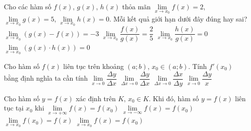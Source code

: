 \begin{ex}%
 Cho các hàm số $f(x)$, $g(x)$, $h(x)$ thỏa mãn $\lim\limits_{x \to x_0} f(x)=2$, $\lim\limits_{x \to x_0} g(x)=5$, $\lim\limits_{x \to  x_0} h(x)=0$. Mỗi kết quả giới hạn dưới đây đúng hay sai?
  \choiceTF
  {$\lim\limits_{x  \to x_0} (g(x)-f(x))=-3$}
  {\True $\lim\limits_{x \to  x_0} \dfrac{f(x)}{g(x)}=\dfrac{2}{5}$}
   {\True $\lim\limits_{x \to x_0} \dfrac{h(x)}{g(x)}=0$}
  {\True $\lim\limits_{x \to  x_0} (g(x)\cdot h(x))=0$}
\end{ex}

\begin{ex}%
	Cho hàm số $ f\left( x \right)  $ liên tục trên khoảng $ (a;b) $, $ x_0 \in (a;b) $. Tính $ f'\left( x_0 \right) $ bằng định nghĩa ta cần tính
	 \choice
		 {$ \mathop {\lim }\limits_{x \to 0} \dfrac{{\Delta y}}{{\Delta x}} $}
		 {\True $ \mathop {\lim }\limits_{\Delta x \to 0} \dfrac{{\Delta y}}{{\Delta x}} $}
		{$ \mathop {\lim }\limits_{\Delta x \to 0}  \dfrac{{\Delta x}}{{\Delta y}} $}
		{$ \mathop {\lim }\limits_{x \to 0}  \dfrac{{\Delta y}}{{x}} $}
\end{ex}

\begin{ex}%
	Cho hàm số $y=f(x)$ xác định trên  $K$, $x_0\in K$. Khi đó, hàm số $y=f(x)$ liên tục tại $x_0$ khi
	\choice 
		{$\lim\limits_{x \to  +\infty}f(x)=f\left( x_0 \right)$}
		{$\lim\limits_{x  \to -\infty}f(x)=f\left( x_0 \right)$}
		{$\lim\limits_{x \to x_0}f\left( x_0 \right)=f(x)$} 
		 {\True $\lim\limits_{x \to x_0}f(x)=f\left( x_0 \right)$}
\end{ex}

